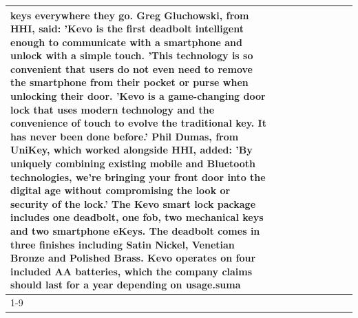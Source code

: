 \begin{table}[H]
\begin{tabular}{lllrlllll}
keys everywhere they go. Greg Gluchowski, from HHI, said: 'Kevo is the first deadbolt intelligent enough to communicate with a smartphone and unlock with a simple touch. 'This technology is so convenient that users do not even need to remove the smartphone from their pocket or purse when unlocking their door. 'Kevo is a game-changing door lock that uses modern technology and the convenience of touch to evolve the traditional key. It has never been done before.' Phil Dumas, from UniKey, which worked alongside HHI, added: 'By uniquely combining existing mobile and Bluetooth technologies, we’re bringing your front door into the digital age without compromising the look or security of the lock.' The Kevo smart lock package includes one deadbolt, one fob, two mechanical keys and two smartphone eKeys. The deadbolt comes in three finishes including Satin Nickel, Venetian Bronze and Polished Brass. Kevo operates on four included AA batteries, which the company claims should last for a year depending on usage.suma \\
\cline{1-9}

\end{tabular}
\end{table}
